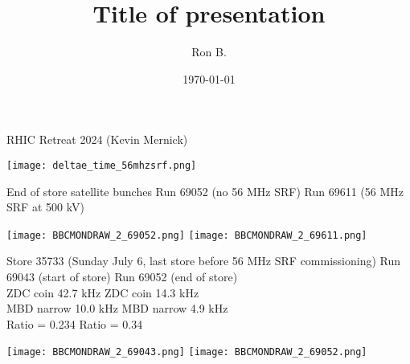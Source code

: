 \documentclass[aspectratio=169,compress,10pt]{beamer}
\title[Title of presentation]{Title of presentation}
\author[Ron B.]{Ron B.}
\institute[UNCG]{\normalsize University of North Carolina Greensboro}
\date[\today]{\today}
\begin{document}

\begin{frame}{RHIC Retreat 2024 (Kevin Mernick)}
\begin{center}
\texttt{[image: deltae\_time\_56mhzsrf.png]}
\end{center}
\end{frame}

\begin{frame}{End of store satellite bunches}
\hspace*{0.5cm} Run 69052 (no 56 MHz SRF) \hspace{2.5cm} Run 69611 (56 MHz SRF at 500 kV) \\
\begin{center}
\texttt{[image: BBCMONDRAW\_2\_69052.png]}
\texttt{[image: BBCMONDRAW\_2\_69611.png]}
\end{center}
\end{frame}

\begin{frame}{Store 35733 (Sunday July 6, last store before 56 MHz SRF commissioning)}
Run 69043 (start of store) \hspace{3cm} Run 69052 (end of store) \\
ZDC coin 42.7 kHz \hspace{4cm} ZDC coin 14.3 kHz \\
MBD narrow 10.0 kHz \hspace{3.5cm} MBD narrow 4.9 kHz \\
Ratio = 0.234 \hspace{4.75cm} Ratio = 0.34
\begin{center}
\texttt{[image: BBCMONDRAW\_2\_69043.png]}
\texttt{[image: BBCMONDRAW\_2\_69052.png]}
\end{center}
\end{frame}
\end{document}
